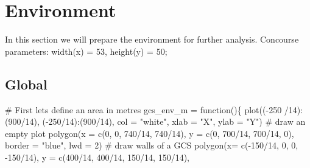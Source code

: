 \documentclass[
  letterpaper,
  DIV=11,
  numbers=noendperiod]{scrreprt}
\newenvironment{Shaded}{\begin{snugshade}}{\end{snugshade}}
\newcommand{\AttributeTok}[1]{\textcolor[rgb]{0.40,0.45,0.13}{#1}}
\newcommand{\CommentTok}[1]{\textcolor[rgb]{0.37,0.37,0.37}{#1}}
\newcommand{\ControlFlowTok}[1]{\textcolor[rgb]{0.00,0.23,0.31}{#1}}
\newcommand{\DecValTok}[1]{\textcolor[rgb]{0.68,0.00,0.00}{#1}}
\newcommand{\FunctionTok}[1]{\textcolor[rgb]{0.28,0.35,0.67}{#1}}
\newcommand{\NormalTok}[1]{\textcolor[rgb]{0.00,0.23,0.31}{#1}}
\newcommand{\OtherTok}[1]{\textcolor[rgb]{0.00,0.23,0.31}{#1}}
\newcommand{\SpecialCharTok}[1]{\textcolor[rgb]{0.37,0.37,0.37}{#1}}
\newcommand{\StringTok}[1]{\textcolor[rgb]{0.13,0.47,0.30}{#1}}
\begin{document}
\hypertarget{environment}{%
\chapter{Environment}\label{environment}}

In this section we will prepare the environment for further analysis.
Concourse parameters: width(x) = 53, height(y) = 50;

\hypertarget{global}{%
\section{Global}\label{global}}

\begin{Shaded}
\begin{Highlighting}[]
\CommentTok{\# First let\textquotesingle{}s define an area in metres}
\NormalTok{gcs\_env\_m }\OtherTok{=} \ControlFlowTok{function}\NormalTok{()\{}
  \FunctionTok{plot}\NormalTok{((}\SpecialCharTok{{-}}\DecValTok{250} \SpecialCharTok{/}\DecValTok{14}\NormalTok{)}\SpecialCharTok{:}\NormalTok{(}\DecValTok{900}\SpecialCharTok{/}\DecValTok{14}\NormalTok{), (}\SpecialCharTok{{-}}\DecValTok{250}\SpecialCharTok{/}\DecValTok{14}\NormalTok{)}\SpecialCharTok{:}\NormalTok{(}\DecValTok{900}\SpecialCharTok{/}\DecValTok{14}\NormalTok{), }\AttributeTok{col =} \StringTok{"white"}\NormalTok{, }\AttributeTok{xlab =} \StringTok{"X"}\NormalTok{, }\AttributeTok{ylab =} \StringTok{"Y"}\NormalTok{) }\CommentTok{\# draw an empty plot}
  \FunctionTok{polygon}\NormalTok{(}\AttributeTok{x =} \FunctionTok{c}\NormalTok{(}\DecValTok{0}\NormalTok{, }\DecValTok{0}\NormalTok{, }\DecValTok{740}\SpecialCharTok{/}\DecValTok{14}\NormalTok{, }\DecValTok{740}\SpecialCharTok{/}\DecValTok{14}\NormalTok{),}
          \AttributeTok{y =} \FunctionTok{c}\NormalTok{(}\DecValTok{0}\NormalTok{, }\DecValTok{700}\SpecialCharTok{/}\DecValTok{14}\NormalTok{, }\DecValTok{700}\SpecialCharTok{/}\DecValTok{14}\NormalTok{, }\DecValTok{0}\NormalTok{),}
          \AttributeTok{border =} \StringTok{"blue"}\NormalTok{,}
          \AttributeTok{lwd =} \DecValTok{2}\NormalTok{) }\CommentTok{\# draw walls of a GCS}
  \FunctionTok{polygon}\NormalTok{(}\AttributeTok{x=} \FunctionTok{c}\NormalTok{(}\SpecialCharTok{{-}}\DecValTok{150}\SpecialCharTok{/}\DecValTok{14}\NormalTok{, }\DecValTok{0}\NormalTok{, }\DecValTok{0}\NormalTok{, }\SpecialCharTok{{-}}\DecValTok{150}\SpecialCharTok{/}\DecValTok{14}\NormalTok{),}
          \AttributeTok{y =} \FunctionTok{c}\NormalTok{(}\DecValTok{400}\SpecialCharTok{/}\DecValTok{14}\NormalTok{, }\DecValTok{400}\SpecialCharTok{/}\DecValTok{14}\NormalTok{, }\DecValTok{150}\SpecialCharTok{/}\DecValTok{14}\NormalTok{, }\DecValTok{150}\SpecialCharTok{/}\DecValTok{14}\NormalTok{),}

\end{Highlighting}
\end{Shaded}
\end{document}
